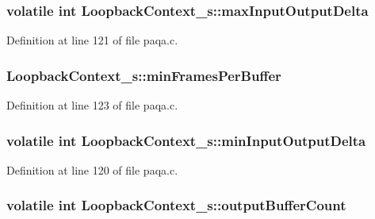 \subsubsection[{\texorpdfstring{max\+Input\+Output\+Delta}{maxInputOutputDelta}}]{\setlength{\rightskip}{0pt plus 5cm}volatile {\bf int} Loopback\+Context\+\_\+s\+::max\+Input\+Output\+Delta}\hypertarget{struct_loopback_context__s_a1d85ea7f97a8ab0b024451c8e90018bd}{}\label{struct_loopback_context__s_a1d85ea7f97a8ab0b024451c8e90018bd}


Definition at line 121 of file paqa.\+c.

\subsubsection[{\texorpdfstring{min\+Frames\+Per\+Buffer}{minFramesPerBuffer}}]{ Loopback\+Context\+\_\+s\+::min\+Frames\+Per\+Buffer}\hypertarget{struct_loopback_context__s_ae1f03610d07860b490e0fc84d4e220a2}{}\label{struct_loopback_context__s_ae1f03610d07860b490e0fc84d4e220a2}


Definition at line 123 of file paqa.\+c.

\subsubsection[{\texorpdfstring{min\+Input\+Output\+Delta}{minInputOutputDelta}}]{\setlength{\rightskip}{0pt plus 5cm}volatile {\bf int} Loopback\+Context\+\_\+s\+::min\+Input\+Output\+Delta}\hypertarget{struct_loopback_context__s_a64264d4030bebe2fa1fcec8b6150a3ec}{}\label{struct_loopback_context__s_a64264d4030bebe2fa1fcec8b6150a3ec}


Definition at line 120 of file paqa.\+c.

\subsubsection[{\texorpdfstring{output\+Buffer\+Count}{outputBufferCount}}]{\setlength{\rightskip}{0pt plus 5cm}volatile {\bf int} Loopback\+Context\+\_\+s\+::output\+Buffer\+Count}\hypertarget{struct_loopback_context__s_a74498622d40b9836000d25d9ea1526e4}{}\label{struct_loopback_context__s_a74498622d40b9836000d25d9ea1526e4}


